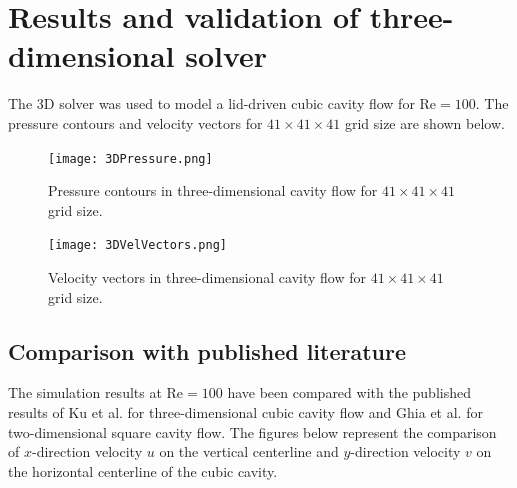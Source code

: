 \documentclass[12pt,a4paper,fleqn]{article}
\begin{document}
\section{Results and validation of three-dimensional solver}

The 3D solver was used to model a lid-driven cubic cavity flow for \(\text{Re}=100\). The pressure contours and velocity vectors for \(41 \times 41 \times 41\) grid size are shown below.

\begin{figure}[H]
    \centering
    \texttt{[image: 3DPressure.png]}
    \caption{Pressure contours in three-dimensional cavity flow for \(41 \times 41 \times 41\) grid size.}
\end{figure}

\begin{figure}[H]
    \centering
    \texttt{[image: 3DVelVectors.png]}
    \caption{Velocity vectors in three-dimensional cavity flow for \(41 \times 41 \times 41\) grid size.}
\end{figure}

\subsection{Comparison with published literature}
The simulation results at \(\text{Re}=100\) have been compared with the published results of Ku et al. \cite{Ku:1987:PMS:33136.33145} for three-dimensional cubic cavity flow and Ghia et al. \cite{GHIA1982387} for two-dimensional square cavity flow. The figures below represent the comparison of \(x\)-direction velocity \(u\) on the vertical centerline and \(y\)-direction velocity \(v\) on the horizontal centerline of the cubic cavity.
\end{document}
